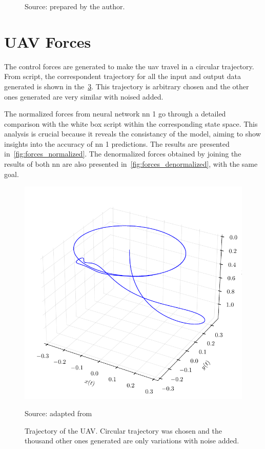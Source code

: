 \begin{figure}[!htb]
\begin{subfigure}{0.49\textwidth}
        \label{fig:test_loss_nn2}
    \end{subfigure}

    {\footnotesize Source: prepared by the author.}
    \label{fig:test_loss}
\end{figure}

\section{UAV Forces}

The control forces are generated to make the \gls*{uav} travel in a circular trajectory. From \citet{geronel2023} script, the correspondent trajectory for all the input and output data generated is shown in the~\cref{fig:trajectory}. 
This trajectory is arbitrary chosen and the other ones generated are very similar with noised added.


The normalized forces from neural network \gls*{nn} 1 go through a detailed comparison with the white box script within the corresponding state space. 
This analysis is crucial because it reveals the consistancy of the model, aiming to show insights into the accuracy of \gls*{nn} 1 predictions.
The results are presented in~\cref{fig:forces_normalized}.
The denormalized forces obtained by joining the results of both \gls*{nn} are also presented in~\cref{fig:forces_denormalized}, with the same goal.

\begin{figure}[!htb]
    \centering
    \caption[Trajectory of the UAV]{Trajectory of the UAV. Circular trajectory was chosen and the thousand other ones generated are only variations with noise added.}
    \includegraphics{figures/4results/uav/trajectory.pdf}
    
    {\footnotesize Source: adapted from \citet{geronel2023}}
    \label{fig:trajectory}
\end{figure}


